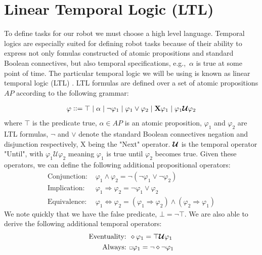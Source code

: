 \section{Linear Temporal Logic (LTL)}
To define tasks for our robot we must choose a high level language. Temporal logics are especially suited for defining robot tasks because of their ability to express not only fomulas constructed of atomic propositions and standard Boolean connectives, but also temporal specifications, e.g.,\ $\alpha$ is true at some point of time. The particular temporal logic we will be using is known as linear temporal logic (LTL) \cite{clarke99}. LTL formulas are defined over a set of atomic propositions $AP$ according to the following grammar: 

\begin{align*}
    \varphi ::= \top \hspace{0.1cm} |\hspace{0.1cm} \alpha \hspace{0.1cm} | \hspace{0.1cm} \neg \varphi_1 \hspace{0.1cm} | \hspace{0.1cm} \varphi_1  \lor \varphi_2 \hspace{0.1cm} | \hspace{0.1cm} \textbf{X} \varphi_1 \hspace{0.1cm} | \hspace{0.1cm} \varphi_1 \bm{\mathcal{U}} \varphi_2
\end{align*}
where $\top$ is the predicate true, $\alpha \in AP$ is an atomic proposition, $\varphi_1$ and $\varphi_2$ are LTL formulas, $\neg$ and $\lor$ denote the standard Boolean connectives negation and disjunction respectively, X being the "Next" operator. $\bm{\mathcal{U}}$ is the temporal operator "Until", with $\varphi_1 \mathcal{U} \varphi_2$ meaning $\varphi_1$ is true until $\varphi_2$ becomes true. Given these operators, we can define the following additional propositional operators:
\begin{align*}
    \text{Conjunction: }&  \varphi_1  \land \varphi_2 = \neg(\neg \varphi_1 \lor \neg \varphi_2) \\
    \text{Implication: }& \varphi_1 \Rightarrow \varphi_2 = \neg \varphi_1 \lor \varphi_2 \\
    \text{Equivalence: }& \varphi_1 \Leftrightarrow \varphi_2 = (\varphi_1 \Rightarrow \varphi_2) \land (\varphi_2 \Rightarrow \varphi_1)
\end{align*}
We note quickly that we have the false predicate, $\bot = \neg \top$.
We are also able to derive the following additional temporal operators:
\begin{align*}
    \text{Eventuality: }& \diamond \varphi_1 = \top \U \varphi_1 \\
    \text{Always: }& \ssquare \varphi_1 = \neg \diamond \neg \varphi_1
\end{align*}

